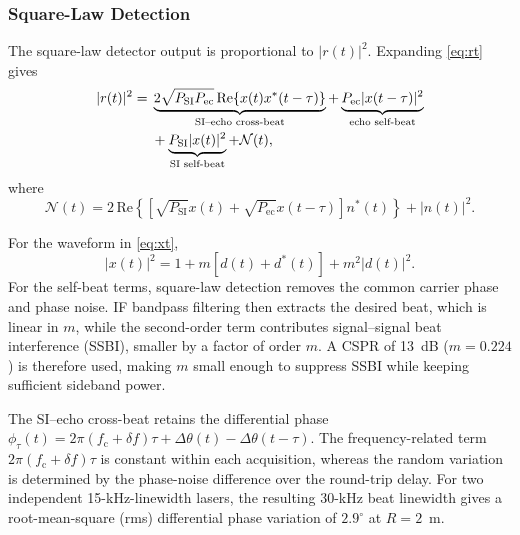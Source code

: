 \documentclass[10pt,journal]{IEEEtran}
\begin{document}
\subsubsection{Square-Law Detection}
\label{sec:sld}

The square-law detector output is proportional to $|r(t)|^2$.
Expanding \eqref{eq:rt} gives
\begin{align}
|r(t)|^2={}&
\underbrace{2\sqrt{P_{\mathrm{SI}}P_{\mathrm{ec}}}
\,\mathrm{Re}\{x(t)x^*(t-\tau)\}}_{\text{SI--echo cross-beat}}
+\underbrace{P_{\mathrm{ec}}|x(t-\tau)|^2}_{\text{echo self-beat}}
\notag\\
&+\underbrace{P_{\mathrm{SI}}|x(t)|^2}_{\text{SI self-beat}}
+\mathcal N(t),
\label{eq:sq_expand}
\end{align}
where
\begin{equation}
\mathcal N(t)
=
2\,\mathrm{Re}\!\left\{
\left[
\sqrt{P_{\mathrm{SI}}}x(t)
+\sqrt{P_{\mathrm{ec}}}x(t-\tau)
\right]n^*(t)
\right\}
+|n(t)|^2.
\label{eq:noise}
\end{equation}

For the waveform in \eqref{eq:xt},
\begin{equation}
|x(t)|^2
=
1+m[d(t)+d^*(t)]+m^2|d(t)|^2.
\label{eq:selfbeat}
\end{equation}
For the self-beat terms, square-law detection removes the common carrier
phase and phase noise. IF bandpass
filtering then extracts the desired beat, which is linear in $m$, while
the second-order term contributes signal--signal beat interference
(SSBI), smaller by a factor of order $m$. A CSPR of 13~dB
($m=0.224$) is therefore used, making $m$ small enough to suppress SSBI
while keeping sufficient sideband power.

The SI--echo cross-beat retains the differential phase
$\phi_\tau(t)=2\pi(f_{\mathrm c}+\delta f)\tau+
\Delta\theta(t)-\Delta\theta(t-\tau)$. The frequency-related term
$2\pi(f_{\mathrm c}+\delta f)\tau$ is constant within each acquisition,
whereas the random variation is determined by the phase-noise difference
over the round-trip delay. For two independent 15-kHz-linewidth lasers,
the resulting 30-kHz beat linewidth gives a root-mean-square (rms)
differential phase variation of $2.9^\circ$ at $R=2$~m.
\end{document}
